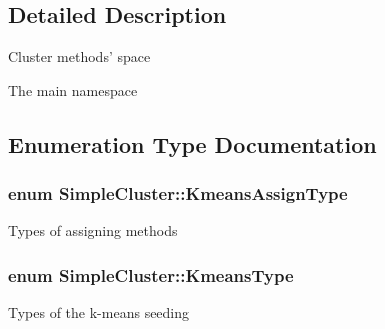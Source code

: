 \subsection{Detailed Description}
Cluster methods' space

The main namespace 

\subsection{Enumeration Type Documentation}
\hypertarget{namespaceSimpleCluster_a1ad2d6129171ff9a5ee57f48b5f3f6e1}{
\subsubsection[{Kmeans\-Assign\-Type}]{\setlength{\rightskip}{0pt plus 5cm}enum {\bf Simple\-Cluster\-::\-Kmeans\-Assign\-Type}\hspace{0.3cm}{\ttfamily [strong]}}}\label{namespaceSimpleCluster_a1ad2d6129171ff9a5ee57f48b5f3f6e1}
Types of assigning methods \hypertarget{namespaceSimpleCluster_a8a8f57121b69a7b43575e4d6a53928e2}{
\subsubsection[{Kmeans\-Type}]{\setlength{\rightskip}{0pt plus 5cm}enum {\bf Simple\-Cluster\-::\-Kmeans\-Type}\hspace{0.3cm}{\ttfamily [strong]}}}\label{namespaceSimpleCluster_a8a8f57121b69a7b43575e4d6a53928e2}
Types of the k-\/means seeding 

